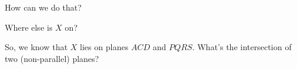 







How can we do that?


Where else is $X$ on?




So, we know that $X$ lies on planes $ACD$ and $PQRS.$ What's the intersection of two (non-parallel) planes?








